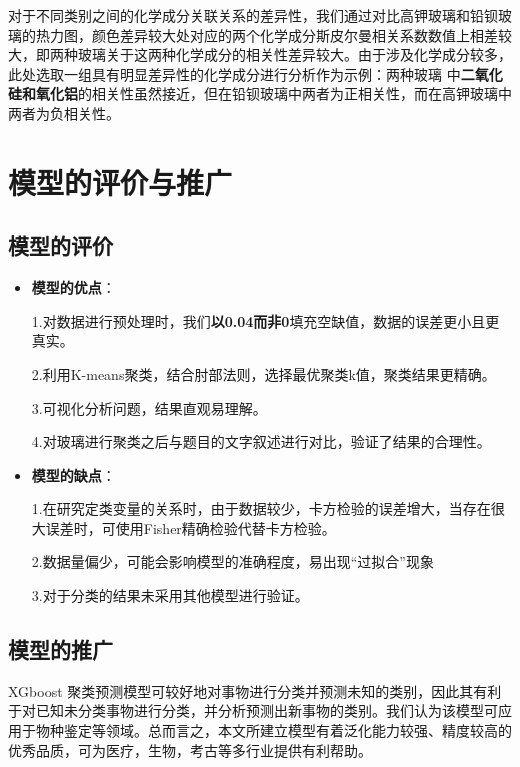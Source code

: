 \documentclass{MathModeling}
\begin{document}
  对于{\heiti 不同类别之间的化学成分关联关系的差异性}，我们通过对比高钾玻璃和铅钡玻璃的热力图，颜色差异较大处对应的两个化学成分斯皮尔曼相关系数数值上相差较大，即两种玻璃关于这两种化学成分的相关性差异较大。由于涉及化学成分较多，此处选取一组具有{\heiti 明显差异性}的化学成分进行分析作为示例：两种玻璃
  中{\textbf{二氧化硅和氧化铝}}的相关性虽然接近，但在铅钡玻璃中两者为正相关性，而在高钾玻璃中两者为负相关性。

\newpage
\section{模型的评价与推广}
\subsection{模型的评价}
\begin{itemize}
	\item \textbf{模型的优点}：
	
	1.对数据进行预处理时，我们{\textbf{以0.04而非0}}填充空缺值，数据的误差更小且更真实。
	
	2.利用K-means聚类，结合肘部法则，选择最优聚类k值，聚类结果更精确。
	
	3.可视化分析问题，结果直观易理解。
	
	4.对玻璃进行聚类之后与题目的文字叙述进行对比，验证了结果的合理性。
	
	\item \textbf{模型的缺点}：
	
	1.在研究定类变量的关系时，由于数据较少，卡方检验的误差增大，当存在很大误差时，可使用Fisher精确检验代替卡方检验。
	
	2.数据量偏少，可能会影响模型的准确程度，易出现“过拟合”现象

	3.对于分类的结果未采用其他模型进行验证。

\end{itemize}

\subsection{模型的推广}
XGboost 聚类预测模型可较好地对事物进行分类并预测未知的类别，因此其有利于对已知未分类事物进行分类，并分析预测出新事物的类别。我们认为该模型可应用于物种鉴定等领域。总而言之，本文所建立模型有着泛化能力较强、精度较高的优秀品质，可为医疗，生物，考古等多行业提供有利帮助。
	
\end{document}
